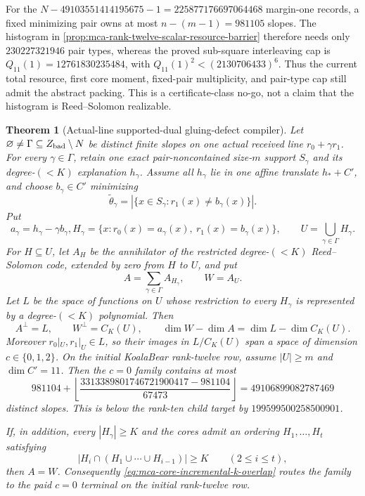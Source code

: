 \documentclass[11pt,a4paper]{amsart}
\numberwithin{equation}{section}
\newtheorem{theorem}{Theorem}[section]
\theoremstyle{remark}
\begin{document}
\begin{remark}
\label{rem:mca-rank-twelve-scalar-pair-barrier}
For the \(N-49103551414195675-1=225877176697064468\) margin-one records, a
fixed minimizing pair owns at most
\(n-(m-1)=981105\) slopes.  The histogram in
\cref{prop:mca-rank-twelve-scalar-resource-barrier} therefore needs only
\(230227321946\) pair types, whereas the proved sub-square interleaving cap
is \(Q_{11}(1)=12761830235484\), with
\(Q_{11}(1)^2<(2130706433)^6\).  Thus the current total resource,
first core moment, fixed-pair multiplicity, and pair-type cap still admit
the abstract packing.  This is a certificate-class no-go, not a claim that
the histogram is Reed--Solomon realizable.
\end{remark}

\begin{theorem}[Actual-line supported-dual gluing-defect compiler]
\label{thm:mca-actual-line-core-gluing-defect}
Let \(\varnothing\ne\Gamma\subseteq Z_{\rm bad}\setminus N\) be distinct
finite slopes on one actual received line \(r_0+\gamma r_1\).  For every
\(\gamma\in\Gamma\), retain one exact pair-noncontained size-\(m\) support
\(S_\gamma\) and its degree-\((<K)\) explanation \(h_\gamma\).  Assume all
\(h_\gamma\) lie in one affine translate \(h_*+C'\), and choose
\(b_\gamma\in C'\) minimizing
\[
 \widetilde\theta_\gamma
 =|\{x\in S_\gamma:r_1(x)\ne b_\gamma(x)\}|.
\]
Put
\[
 a_\gamma=h_\gamma-\gamma b_\gamma,
 H_\gamma=\{x:r_0(x)=a_\gamma(x),\ r_1(x)=b_\gamma(x)\},
 \qquad U=\bigcup_{\gamma\in\Gamma}H_\gamma.
\]
For \(H\subseteq U\), let \(A_H\) be the annihilator of the restricted
degree-\((<K)\) Reed--Solomon code, extended by zero from \(H\) to \(U\),
and put
\[
 A=\sum_{\gamma\in\Gamma}A_{H_\gamma},
 \qquad W=A_U.
\]
Let \(L\) be the space of functions on \(U\) whose restriction to every
\(H_\gamma\) is represented by a degree-\((<K)\) polynomial.  Then
\[
 A^\perp=L,
 \qquad W^\perp=C_K(U),
 \qquad
 \dim W-\dim A=\dim L-\dim C_K(U).
 \tag{GL}\label{eq:mca-actual-line-core-gluing-defect}
\]
Moreover \(r_0|_U,r_1|_U\in L\), so their images in \(L/C_K(U)\) span a
space of dimension \(c\in\{0,1,2\}\).  On the initial KoalaBear rank-twelve
row, assume \(|U|\ge m\) and \(\dim C'=11\).  Then the \(c=0\) family
contains at most
\[
 981104+
 \left\lfloor
  \frac{3313389801746721900417-981104}{67473}
 \right\rfloor
 =49106899082787469
 \tag{G0}\label{eq:mca-rank-twelve-gluing-rank-zero}
\]
distinct slopes.  This is below the rank-ten child target by
\(199599500258500901\).

If, in addition, every \(|H_\gamma|\ge K\) and the cores admit an ordering
\(H_1,\ldots,H_t\) satisfying
\[
 |H_i\cap(H_1\cup\cdots\cup H_{i-1})|\ge K
 \qquad(2\le i\le t),
 \tag{GK}\label{eq:mca-core-incremental-k-overlap}
\]
then \(A=W\).  Consequently \eqref{eq:mca-core-incremental-k-overlap}
routes the family to the paid \(c=0\) terminal on the initial rank-twelve
row.
\end{theorem}
\end{document}
